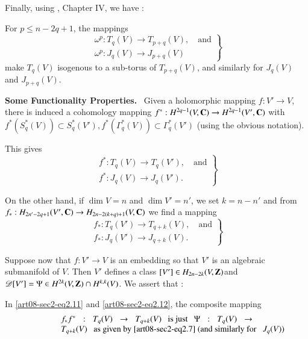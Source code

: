 Finally, using \cite{art08-key23}, Chapter IV, we have :

For $p\leq n-2q+1$, the mappings
\begin{equation}
\left.
\begin{array}{c}
\omega^{p}:T_{q}(V)\to T_{p+q}(V),\text{~~ and}\\[4pt]
\omega^{p}: J_{q}(V)\to J_{p+q}(V)
\end{array}
\right\}\label{art08-sec2-eq2.10}
\end{equation}
make $T_{q}(V)$ isogenous to a sub-torus of $T_{p+q}(V)$, and similarly for $J_{q}(V)$ and $J_{p+q}(V)$.

\medskip
\noindent
{\bf Some Functionality Properties.}~ Given a holomorphic mapping $f:V'\to V$, there is induced a cohomology mapping $f^{*}:H^{2q-1}(V,\mathbf{C})\to H^{2q-1}(V',\mathbf{C})$ with $f^{*}(S^{*}_{q}(V))\subset S^{*}_{q}(V'),f^{*}(\Gamma^{*}_{q}(V))\subset \Gamma^{*}_{q}(V')$ (using the obvious notation).

This gives
\begin{equation}
\left.
\begin{array}{c}
f^{*}:T_{q}(V)\to T_{q}(V'),\text{~~ and}\\[4pt]
f^{*}:J_{q}(V)\to J_{q}(V').
\end{array}
\right\}\label{art08-sec2-eq2.11}
\end{equation}

On the other hand, if $\dim V=n$ and $\dim V'=n'$, we set $k=n-n'$ and from $f_{*}:H_{2n'-2q+1}(V',\mathbf{C})\to H_{2n-2(k+q)+1}(V,\mathbf{C})$ we find a mapping
\begin{equation}
\left.
\begin{array}{c}
f_{*}:T_{q}(V')\to T_{q+k}(V),\text{~~ and}\\[4pt]
f_{*}:J_{q}(V')\to J_{q+k}(V).
\end{array}
\right\}\label{art08-sec2-eq2.12}
\end{equation}

Suppose now that $f:V'\to V$ is an embedding so that $V'$ is an algebraic submanifold of $V$. Then $V'$ defines a class $[V']\in H_{2n-2k}(V,\mathbf{Z})$\pageoriginale and $\mathscr{D}[V']=\Psi\in H^{2k}(V,\mathbf{Z})\cap H^{k,k}(V)$. We assert that :

In \eqref{art08-sec2-eq2.11} and \eqref{art08-sec2-eq2.12}, the composite mapping
\begin{equation}
\begin{array}{p{8cm}}
$f_{*}f^{*}:T_{q}(V)\to T_{q+k}(V)\text{~~ is just~~ }\Psi:T_{q}(V)\to T_{q+k}(V)\text{~~ as given by \eqref{art08-sec2-eq2.7} (and similarly for~~ $J_{q}(V)$)}$
\end{array}\label{art08-sec2-eq2.13}
\end{equation}

